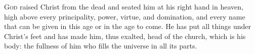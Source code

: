 \lettrine[lines=3,loversize=0.15]{G}{od} raised Christ from the dead and seated him at his right hand in heaven, high above every principality, power, virtue, and domination, and every name that can be given in this age or in the age to come. He has put all things under Christ’s feet and has made him, thus exalted, head of the church, which is his body: the fullness of him who fills the universe in all its parts.
